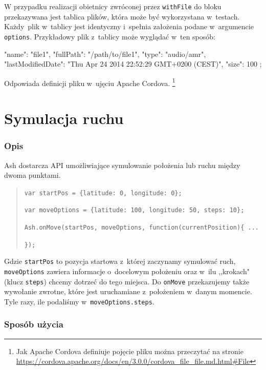 \documentclass[brudnopis]{xmgr}
\begin{document}
W przypadku realizacji obietnicy zwróconej przez \texttt{withFile} do bloku przekazywana jest tablica plików, która może być wykorzystana w~testach. Każdy~plik w~tablicy jest identyczny i~spełnia założenia podane w~argumencie \texttt{options}. Przykładowy plik z~tablicy może wyglądać w~ten sposób:

\begin{javascriptcode}
   {
       "name": "file1",
       "fullPath": "/path/to/file1",
       "type": "audio/amr",
       "lastModifiedDate": 
            "Thu Apr 24 2014 22:52:29 GMT+0200 (CEST)",
       "size": 100
   };
\end{javascriptcode}

Odpowiada definicji pliku w~ujęciu Apache Cordova. 
\footnote{Jak Apache Cordova definiuje pojęcie pliku można przeczytać na stronie \url{https://cordova.apache.org/docs/en/3.0.0/cordova_file_file.md.html\#File} }

\section{Symulacja ruchu}

\subsubsection{Opis}
Ash dostarcza API umożliwiające symulowanie położenia lub ruchu między dwoma punktami.

\begin{quote}
  \texttt{var startPos = \{latitude: 0, longitude: 0\};}

  \texttt{var moveOptions = \{latitude: 100, longitude: 50, steps: 10\};}

  \texttt{Ash.onMove(startPos, moveOptions, function(currentPosition)\{ ... }

  \texttt{\});  }
\end{quote}

Gdzie \texttt{startPos} to pozycja startowa z~której zaczynamy symulować ruch, \texttt{moveOptions} zawiera informacje o~docelowym położeniu oraz w~ilu ,,krokach" (klucz \texttt{steps}) chcemy dotrzeć do tego miejsca. Do \texttt{onMove} przekazujemy także wywołanie zwrotne, które jest uruchamiane z~położeniem w~danym momencie. Tyle razy, ile podaliśmy w~\texttt{moveOptions.steps}. 

\subsubsection{Sposób użycia}
\end{document}

